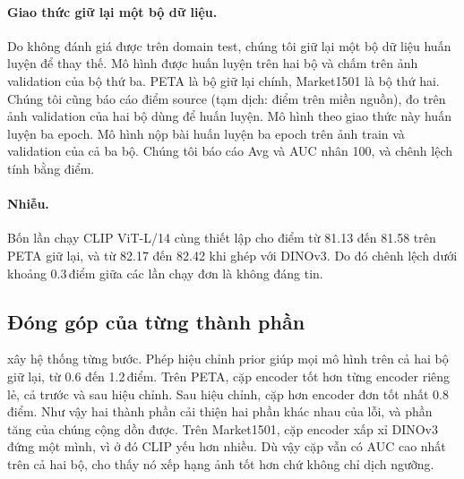\documentclass[10pt,twocolumn,letterpaper]{article}
\newcommand{\pts}{\,điểm}
\begin{document}
\begin{table}[t]
\centering\small
\setlength{\tabcolsep}{3pt}
\caption{Dữ liệu huấn luyện của UPAR 2027 Track~1.}
\label{tab:data}
\end{table}

\paragraph{Giao thức giữ lại một bộ dữ liệu.} Do không đánh giá được trên domain test, chúng tôi giữ lại một bộ dữ liệu huấn luyện để thay thế. Mô hình được huấn luyện trên hai bộ và chấm trên ảnh validation của bộ thứ ba. PETA là bộ giữ lại chính, Market1501 là bộ thứ hai. Chúng tôi cũng báo cáo điểm source (tạm dịch: điểm trên miền nguồn), đo trên ảnh validation của hai bộ dùng để huấn luyện. Mô hình theo giao thức này huấn luyện ba epoch. Mô hình nộp bài huấn luyện ba epoch trên ảnh train và validation của cả ba bộ. Chúng tôi báo cáo Avg và AUC nhân 100, và chênh lệch tính bằng điểm.

\paragraph{Nhiễu.} Bốn lần chạy CLIP ViT-L/14 cùng thiết lập cho điểm từ 81.13 đến 81.58 trên PETA giữ lại, và từ 82.17 đến 82.42 khi ghép với DINOv3. Do đó chênh lệch dưới khoảng 0.3\pts{} giữa các lần chạy đơn là không đáng tin.

\subsection{Đóng góp của từng thành phần}
\label{sec:exp_main}

 xây hệ thống từng bước. Phép hiệu chỉnh prior giúp mọi mô hình trên cả hai bộ giữ lại, từ 0.6 đến 1.2\pts. Trên PETA, cặp encoder tốt hơn từng encoder riêng lẻ, cả trước và sau hiệu chỉnh. Sau hiệu chỉnh, cặp hơn encoder đơn tốt nhất 0.8\pts. Như vậy hai thành phần cải thiện hai phần khác nhau của lỗi, và phần tăng của chúng cộng dồn được. Trên Market1501, cặp encoder xấp xỉ DINOv3 đứng một mình, vì ở đó CLIP yếu hơn nhiều. Dù vậy cặp vẫn có AUC cao nhất trên cả hai bộ, cho thấy nó xếp hạng ảnh tốt hơn chứ không chỉ dịch ngưỡng.
\end{document}
